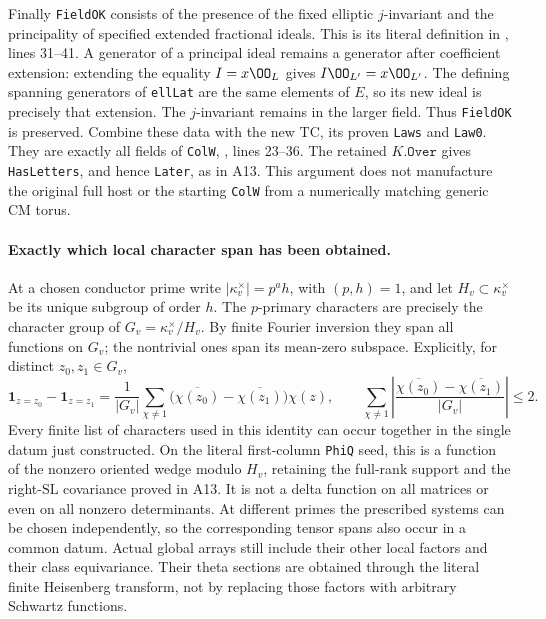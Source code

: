 \documentclass[11pt]{article}
\theoremstyle{definition}\newtheorem{definition}[theorem]{Definition}\newtheorem{remark}[theorem]{Remark}
\begin{document}
Finally \texttt{FieldOK} consists of the presence of the fixed
elliptic $j$-invariant and the principality of specified extended
fractional ideals.  This is its literal definition in
,
lines 31--41.  A generator of a principal ideal remains a generator
after coefficient extension: extending the equality
$I=x\OO_L$ gives $I\OO_{L'}=x\OO_{L'}$.  The defining spanning
generators of \texttt{ellLat} are the same elements of $E$, so its
new ideal is precisely that extension.  The $j$-invariant remains
in the larger field.  Thus \texttt{FieldOK} is preserved.
Combine these data with the new TC, its proven \texttt{Laws} and
\texttt{Law0}.  They are exactly all fields of \texttt{ColW},
,
lines 23--36.  The retained $K.\texttt{Over}$ gives
\texttt{HasLetters}, and hence \texttt{Later}, as in A13.
This argument does not manufacture the original full host or
the starting \texttt{ColW} from a numerically matching generic CM torus.

\paragraph{Exactly which local character span has been obtained.}
At a chosen conductor prime write
$|\kappa_v^\times|=p^a h$, with $(p,h)=1$, and let
$H_v\subset\kappa_v^\times$ be its unique subgroup of order $h$.
The $p$-primary characters are precisely the character group of
$G_v=\kappa_v^\times/H_v$.  By finite Fourier inversion they span
all functions on $G_v$; the nontrivial ones span its mean-zero
subspace.  Explicitly, for distinct $z_0,z_1\in G_v$,
\[
 \mathbf1_{z=z_0}-\mathbf1_{z=z_1}
  =\frac1{|G_v|}\sum_{\chi\ne1}
       \bigl(\overline{\chi(z_0)}-\overline{\chi(z_1)}\bigr)\chi(z),
 \qquad
 \sum_{\chi\ne1}
   \left|\frac{\overline{\chi(z_0)}-\overline{\chi(z_1)}}{|G_v|}\right|
   \leq2.
 \tag{A14f}
\]
Every finite list of characters used in this identity can occur
together in the single datum just constructed.  On the literal
first-column \texttt{PhiQ} seed, this is a function of the
nonzero oriented wedge modulo $H_v$, retaining the full-rank support
and the right-$\mathrm{SL}$ covariance proved in A13.  It is not a
delta function on all matrices or even on all nonzero determinants.
At different primes the prescribed systems can be chosen independently,
so the corresponding tensor spans also occur in a common datum.
Actual global arrays still include their other local factors and
their class equivariance.  Their theta sections are obtained through
the literal finite Heisenberg transform, not by replacing those
factors with arbitrary Schwartz functions.
\end{document}
